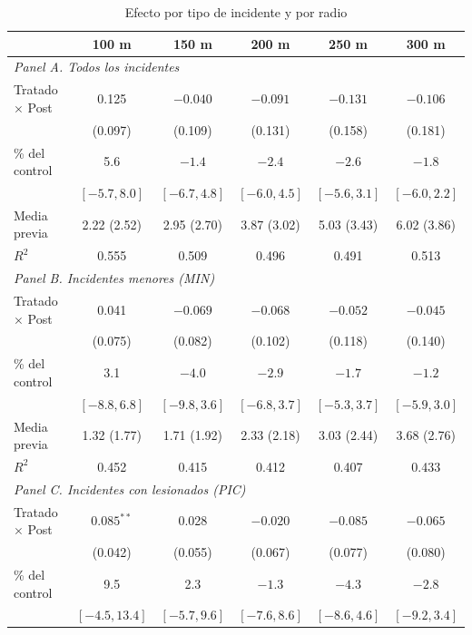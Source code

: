\begin{table}[htbp]
    \centering
    \caption{Efecto por tipo de incidente y por radio}
    \label{tab:por-nivel}
    \scriptsize
    \setlength{\tabcolsep}{3pt}
    \renewcommand{\arraystretch}{0.9}
    \begin{tabular}{l c c c c c}
        \toprule
        & 100 m & 150 m & 200 m & 250 m & 300 m \\
        \midrule
        \multicolumn{6}{l}{\textit{Panel A. Todos los incidentes}} \\
        Tratado $\times$ Post & 0.125 & $-0.040$ & $-0.091$ & $-0.131$ & $-0.106$ \\
         & (0.097) & (0.109) & (0.131) & (0.158) & (0.181) \\
        \% del control & 5.6 & $-1.4$ & $-2.4$ & $-2.6$ & $-1.8$ \\
         & $[-5.7, 8.0]$ & $[-6.7, 4.8]$ & $[-6.0, 4.5]$ & $[-5.6, 3.1]$ & $[-6.0, 2.2]$ \\
        Media previa & 2.22 (2.52) & 2.95 (2.70) & 3.87 (3.02) & 5.03 (3.43) & 6.02 (3.86) \\
        $R^2$ & 0.555 & 0.509 & 0.496 & 0.491 & 0.513 \\
        \midrule
        \multicolumn{6}{l}{\textit{Panel B. Incidentes menores (MIN)}} \\
        Tratado $\times$ Post & 0.041 & $-0.069$ & $-0.068$ & $-0.052$ & $-0.045$ \\
         & (0.075) & (0.082) & (0.102) & (0.118) & (0.140) \\
        \% del control & 3.1 & $-4.0$ & $-2.9$ & $-1.7$ & $-1.2$ \\
         & $[-8.8, 6.8]$ & $[-9.8, 3.6]$ & $[-6.8, 3.7]$ & $[-5.3, 3.7]$ & $[-5.9, 3.0]$ \\
        Media previa & 1.32 (1.77) & 1.71 (1.92) & 2.33 (2.18) & 3.03 (2.44) & 3.68 (2.76) \\
        $R^2$ & 0.452 & 0.415 & 0.412 & 0.407 & 0.433 \\
        \midrule
        \multicolumn{6}{l}{\textit{Panel C. Incidentes con lesionados (PIC)}} \\
        Tratado $\times$ Post & $0.085^{**}$ & 0.028 & $-0.020$ & $-0.085$ & $-0.065$ \\
         & (0.042) & (0.055) & (0.067) & (0.077) & (0.080) \\
        \% del control & 9.5 & 2.3 & $-1.3$ & $-4.3$ & $-2.8$ \\
         & $[-4.5, 13.4]$ & $[-5.7, 9.6]$ & $[-7.6, 8.6]$ & $[-8.6, 4.6]$ & $[-9.2, 3.4]$ \\

\end{tabular}
\end{table}
